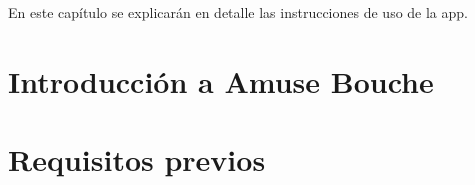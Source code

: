 En este capítulo se explicarán en detalle las instrucciones de uso de la
app.

\section{Introducción a Amuse Bouche}


\section{Requisitos previos}
